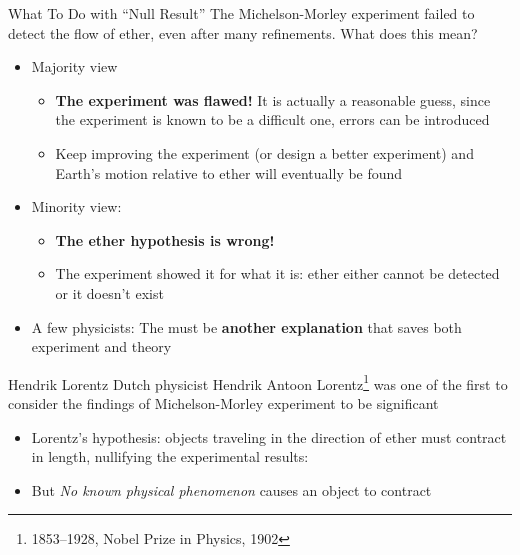 \documentclass[12pt,compress,aspectratio=169]{beamer}
\newcommand{\bigsqrt}{\ensuremath\sqrt{1-\left(\frac{v}{c}\right)^2}}
\newcommand{\eq}[2]{\vspace{#1}{\Large\begin{displaymath}#2\end{displaymath}}}
\begin{document}
\begin{frame}{What To Do with ``Null Result''}
  The Michelson-Morley experiment failed to detect the flow of ether, even
  after many refinements. What does this mean?
  \begin{itemize}
  \item Majority view
    \begin{itemize}
    \item\textbf{The experiment was flawed!} It is actually a reasonable
      guess, since the experiment is known to be a difficult one, errors can
      be introduced
    \item Keep improving the experiment (or design a better experiment) and
      Earth's motion relative to ether will eventually be found
    \end{itemize}
  \item Minority view:
    \begin{itemize}
    \item\textbf{The ether hypothesis is wrong!}
    \item The experiment showed it for what it is: ether either cannot be
      detected or it doesn't exist
    \end{itemize}
  \item A few physicists: The must be \textbf{another explanation} that saves
    both experiment and theory
  \end{itemize}
\end{frame}



\begin{frame}{Hendrik Lorentz}
  Dutch physicist Hendrik Antoon Lorentz\footnote{1853--1928, Nobel Prize in
    Physics, 1902} was one of the first to consider the findings of
  Michelson-Morley experiment to be significant
  \begin{itemize}
  \item Lorentz's hypothesis: objects traveling in the direction of ether must
    contract in length, nullifying the experimental results:

    \eq{-.2in}{
      \boxed{\beta=\bigsqrt}
    }
  \item But \emph{No known physical phenomenon} causes an object to contract
  \end{itemize}
\end{frame}
\end{document}
